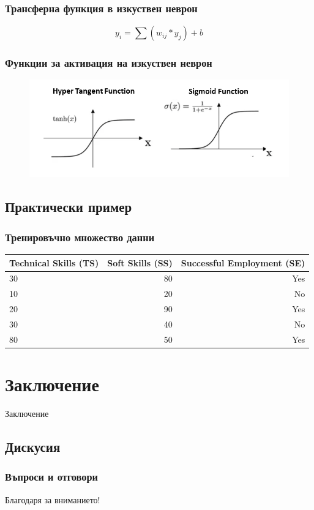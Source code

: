 \documentclass{beamer}
\begin{document}
\begin{frame}
\frametitle{Трансферна функция в изкуствен неврон}
\begin{equation}
y_i = \sum{(w_{ij}*y_j)} + b
\end{equation}
\end{frame}

\begin{frame}
\frametitle{Функции за активация на изкуствен неврон}
\begin{figure}[]\includegraphics[width=\textwidth,height=0.75\textheight]{pic0064}\end{figure}
\end{frame}

\subsection{Практически пример}

\begin{frame}
\frametitle{Тренировъчно множество данни}
\begin{table}[ht]
\centering
\begin{tabular}{|l|r|r|} 
	\hline
	Technical Skills (TS) & Soft Skills (SS) & Successful Employment (SE) \\
	\hline\hline
	30 & 80 & Yes \\
	\hline
	10 & 20 & No \\
	\hline
	20 & 90 & Yes \\
	\hline
	30 & 40 & No \\
	\hline
	80 & 50 & Yes \\
	\hline
\end{tabular}
\end{table}
\end{frame}

\begin{frame}
\frametitle{}
\begin{block}{}
\end{block}
\end{frame}

\section{Заключение}

\begin{frame}
\center \huge{Заключение}
\end{frame}

\subsection{Дискусия}

\begin{frame}
\frametitle{Въпроси и отговори}
\center \huge{Благодаря за вниманието!}
\end{frame}
\end{document}
